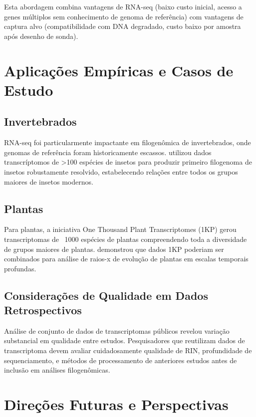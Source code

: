 Esta abordagem combina vantagens de RNA-seq (baixo custo inicial, acesso a genes múltiplos sem conhecimento de genoma de referência) com vantagens de captura alvo (compatibilidade com DNA degradado, custo baixo por amostra após desenho de sonda).

\section{Aplicações Empíricas e Casos de Estudo}

\subsection{Invertebrados}

RNA-seq foi particularmente impactante em filogenômica de invertebrados, onde genomas de referência foram historicamente escassos. \textcite{misof2014} utilizou dados transcríptomos de >100 espécies de insetos para produzir primeiro filogenoma de insetos robustamente resolvido, estabelecendo relações entre todos os grupos maiores de insetos modernos.

\subsection{Plantas}

Para plantas, a iniciativa One Thousand Plant Transcriptomes (1KP) gerou transcriptomas de ~1000 espécies de plantas compreendendo toda a diversidade de grupos maiores de plantas. \textcite{onetp2019} demonstrou que dados 1KP poderiam ser combinados para análise de raios-x de evolução de plantas em escalas temporais profundas.

\subsection{Considerações de Qualidade em Dados Retrospectivos}

Análise de conjunto de dados de transcriptomas públicos revelou variação substancial em qualidade entre estudos. Pesquisadores que reutilizam dados de transcriptoma devem avaliar cuidadosamente qualidade de RIN, profundidade de sequenciamento, e métodos de processamento de anteriores estudos antes de inclusão em análises filogenômicas.

\section{Direções Futuras e Perspectivas}

